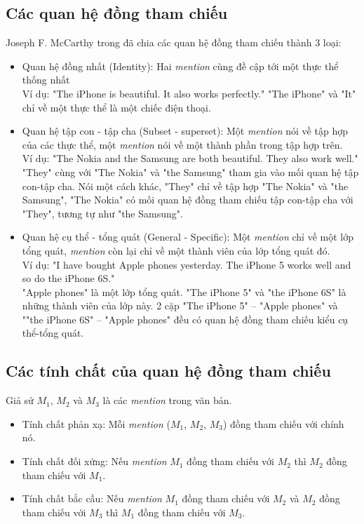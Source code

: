 \documentclass[12pt]{report}
\begin{document}
			\subsection*{Các quan hệ đồng tham chiếu}		
				Joseph F. McCarthy trong \cite{corefdef} đã chia các quan hệ đồng tham chiếu thành 3 loại: 
				\begin{itemize}
					\item{Quan hệ đồng nhất (Identity): Hai \textit{mention} cùng đề cập tới một thực thể thống nhất\\
					Ví dụ: "The iPhone is beautiful. It also works perfectly."
					"The iPhone" và "It" chỉ về một thực thể là một chiếc điện thoại.}
					\item{Quan hệ tập con - tập cha (Subset - superset): Một \textit{mention} nói về tập hợp của các thực thể, một \textit{mention} nói về một thành phần trong tập hợp trên.\\
					Ví dụ: "The Nokia and the Samsung are both beautiful. They also work well."\\
					"They" cùng với "The Nokia" và "the Samsung" tham gia vào mối quan hệ tập con-tập cha. Nói một cách khác, "They" chỉ về tập hợp "The Nokia" và "the Samsung", "The Nokia" có mối quan hệ đồng tham chiếu tập con-tập cha với "They", tương tự như "the Samsung".}
					\item{Quan hệ cụ thể - tổng quát (General - Specific): Một \textit{mention} chỉ về một lớp tổng quát, \textit{mention} còn lại chỉ về một thành viên của lớp tổng quát đó.\\
					Ví dụ: "I have bought Apple phones yesterday. The iPhone 5 works well and so do the iPhone 6S."\\
					"Apple phones" là một lớp tổng quát. "The iPhone 5" và "the iPhone 6S" là những thành viên của lớp này. 2 cặp "The iPhone 5" – "Apple phones" và ""the iPhone 6S" – "Apple phones" đều có quan hệ đồng tham chiếu kiểu cụ thể-tổng quát.}
				\end{itemize}
			\subsection*{Các tính chất của quan hệ đồng tham chiếu}
			Giả sử $M_1$, $M_2$ và $M_3$ là các \textit{mention} trong văn bản.
			\begin{itemize}
				\item{Tính chất phản xạ: Mỗi \textit{mention} ($M_1$, $M_2$, $M_3$) đồng tham chiếu với chính nó.}
				\item{Tính chất đối xứng: Nếu \textit{mention} $M_1$ đồng tham chiếu với $M_2$ thì $M_2$ đồng tham chiếu với $M_1$.}
				\item{Tính chất bắc cầu: Nếu \textit{mention} $M_1$ đồng tham chiếu với $M_2$ và $M_2$ đồng tham chiếu với $M_3$ thì $M_1$ đồng tham chiếu với $M_3$.}
			\end{itemize}
\end{document}
